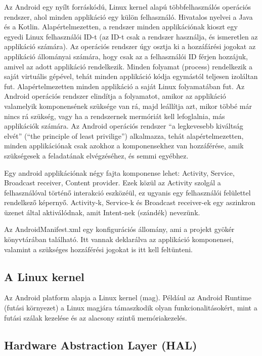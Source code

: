 Az Android\cite{android} egy nyílt forráskódú, Linux kernel alapú többfelhasználós operációs rendszer, ahol minden applikáció egy külön felhasználó. Hivatalos nyelvei a Java és a Kotlin. Alapértelmezetten, a rendszer minden applikációnak kioszt egy egyedi Linux felhasználói ID-t (az ID-t csak a rendszer használja, és ismeretlen az applikáció számára). Az operációs rendszer úgy osztja ki a hozzáfárési jogokat az applikáció állományai számára, hogy csak az a felhasználói ID férjen hozzájuk, amivel az adott applikáció rendelkezik. Minden folyamat (process) rendelkezik a saját virtuális gépével, tehát minden applikáció kódja egymástól teljesen izoláltan fut. Alapértelmezetten minden applikáció a saját Linux folyamatában fut. Az Android operációs rendszer elindítja a folyamatot, amikor az applikáció valamelyik komponensének szüksége van rá, majd leállítja azt, mikor többé már nincs rá szükség, vagy ha a rendszernek mermóriát kell lefoglalnia, más applikációk számára. Az Android operációs rendszer “a legkevesebb kiváltság elvét” (“the principle of least privilige”) alkalmazza, tehát alapértelmezetten, minden applikációnak csak azokhoz a komponensekhez van hozzáférése, amik szükségesek a feladatának elvégzéséhez, és semmi egyébhez.

Egy android applikációnak négy fajta komponense lehet: Activity, Service, Broadcast receiver, Content provider. Ezek közül az Activity szolgál a felhasználóval történő interakció eszközéül, ez ugyanis egy felhasználói felülettel rendelkező képernyő. Activity-k, Service-k és Broadcast receiver-ek egy aszinkron üzenet által aktiválódnak, amit Intent-nek (szándék) nevezünk.

Az AndroidManifest.xml egy konfigurációs állomány, ami a projekt gyökér könyvtárában található. Itt vannak deklarálva az applikáció komponensei, valamint a szükséges hozzáférési jogokat is itt kell feltünteni.

\subsection{A Linux kernel}

Az Android platform alapja a Linux kernel (mag). Például az Android Runtime (futási környezet) a Linux magjára támaszkodik olyan funkcionalitásokért, mint a futási szálak kezelése és az alacsony szintű memóriakezelés.

\subsection{Hardware Abstraction Layer (HAL)}

